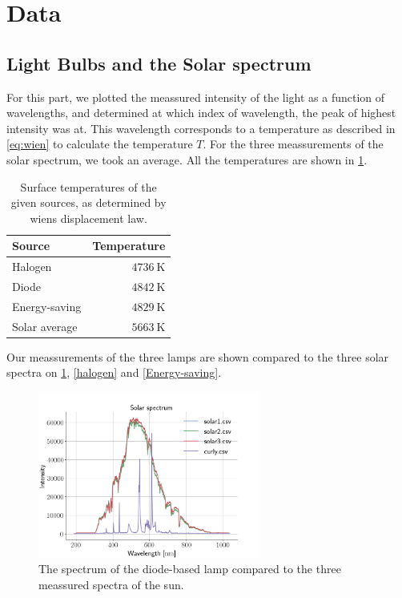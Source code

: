 \section{Data}

\subsection{Light Bulbs and the Solar spectrum}
For this part, we plotted the meassured intensity of the light as a function of 
wavelengths, and determined at which index of wavelength, the peak of highest
intensity was at. This wavelength corresponds to a temperature as described in
\cref{eq:wien} to calculate the temperature $T$.
For the three meassurements of the solar spectrum, we took an average. All the
temperatures are shown in \cref{tab:temp}.
\begin{table}[h]
\centering
\begin{tabular}[h]{lr}
\toprule
Source & Temperature\\
\midrule
Halogen       & $\SI{4736}{\kelvin}$\\
Diode         & $\SI{4842}{\kelvin}$\\
Energy-saving & $\SI{4829}{\kelvin}$\\
Solar average & $\SI{5663}{\kelvin}$\\
\bottomrule
\end{tabular}
\caption{Surface temperatures of the given sources, as determined by wiens
displacement law.}
\label{tab:temp}
\end{table}
Our meassurements of the three lamps are shown compared to the three solar
spectra on \cref{diode}, \cref{halogen} and \cref{Energy-saving}.

\begin{figure}[h!]
\centering
\includegraphics[width=0.65\textwidth]{SolarComparison0}
\caption{The spectrum of the diode-based lamp compared to the three meassured spectra of
the sun.} 
\label{diode}
\end{figure}

